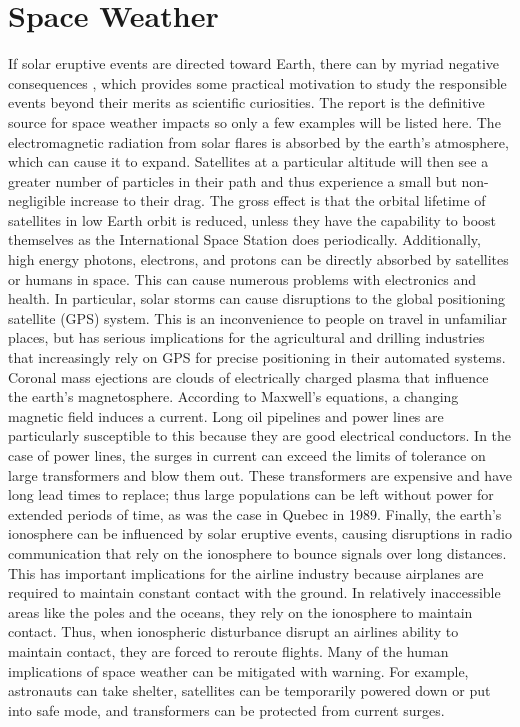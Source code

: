\section{Space Weather}
\label{sec:spaceweather}
If solar eruptive events are directed toward Earth, there can by myriad negative consequences \citep{NRC2008}, which provides some practical motivation to study the responsible events beyond their merits as scientific curiosities. The \citet{NRC2008} report is the definitive source for space weather impacts so only a few examples will be listed here. The electromagnetic radiation from solar flares is absorbed by the earth's atmosphere, which can cause it to expand. Satellites at a particular altitude will then see a greater number of particles in their path and thus experience a small but non-negligible increase to their drag. The gross effect is that the orbital lifetime of satellites in low Earth orbit is reduced, unless they have the capability to boost themselves as the International Space Station does periodically. Additionally, high energy photons, electrons, and protons can be directly absorbed by satellites or humans in space. This can cause numerous problems with electronics and health. In particular, solar storms can cause disruptions to the global positioning satellite (GPS) system. This is an inconvenience to people on travel in unfamiliar places, but has serious implications for the agricultural and drilling industries that increasingly rely on GPS for precise positioning in their automated systems. Coronal mass ejections are clouds of electrically charged plasma that influence the earth's magnetosphere. According to Maxwell's equations, a changing magnetic field induces a current. Long oil pipelines and power lines are particularly susceptible to this because they are good electrical conductors. In the case of power lines, the surges in current can exceed the limits of tolerance on large transformers and blow them out. These transformers are expensive and have long lead times to replace; thus large populations can be left without power for extended periods of time, as was the case in Quebec in 1989. Finally, the earth's ionosphere can be influenced by solar eruptive events, causing disruptions in radio communication that rely on the ionosphere to bounce signals over long distances. This has important implications for the airline industry because airplanes are required to maintain constant contact with the ground. In relatively inaccessible areas like the poles and the oceans, they rely on the ionosphere to maintain contact. Thus, when ionospheric disturbance disrupt an airlines ability to maintain contact, they are forced to reroute flights. Many of the human implications of space weather can be mitigated with warning. For example, astronauts can take shelter, satellites can be temporarily powered down or put into safe mode, and transformers can be protected from current surges. 

